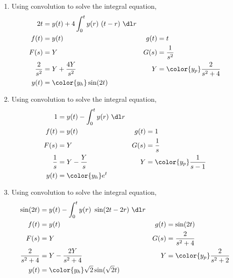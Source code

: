 \begin{enumerate}
    \item Using convolution to solve the integral equation,
          \begin{align}
              2t            & = y(t) + 4 \int_{0}^{t} y(r)\ (t-r)\ \dl r   \\
              f(t)          & = y(t)                                     &
              g(t)          & = t                                          \\
              F(s)          & = Y                                        &
              G(s)          & = \frac{1}{s^2}                              \\
              \frac{2}{s^2} & = Y + \frac{4Y}{s^2}                       &
              Y             & = \color{y_p} \frac{2}{s^2 + 4}              \\
              y(t)          & = \color{y_h} \sin(2t)
          \end{align}

    \item Using convolution to solve the integral equation,
          \begin{align}
              1           & = y(t) - \int_{0}^{t} y(r)\ \dl r   \\
              f(t)        & = y(t)                            &
              g(t)        & = 1                                 \\
              F(s)        & = Y                               &
              G(s)        & = \frac{1}{s}                       \\
              \frac{1}{s} & = Y - \frac{Y}{s}                 &
              Y           & = \color{y_p} \frac{1}{s - 1}       \\
              y(t)        & = \color{y_h} e^{t}
          \end{align}

    \item Using convolution to solve the integral equation,
          \begin{align}
              \sin(2t)          & = y(t) - \int_{0}^{t} y(r)\ \sin(2t - 2r)\ \dl r   \\
              f(t)              & = y(t)                                           &
              g(t)              & = \sin(2t)                                         \\
              F(s)              & = Y                                              &
              G(s)              & = \frac{2}{s^2 + 4}                                \\
              \frac{2}{s^2 + 4} & = Y - \frac{2Y}{s^2 + 4}                         &
              Y                 & = \color{y_p} \frac{2}{s^2 + 2}                    \\
              y(t)              & = \color{y_h} \sqrt{2}\sin(\sqrt{2}t)
          \end{align}


\end{enumerate}
